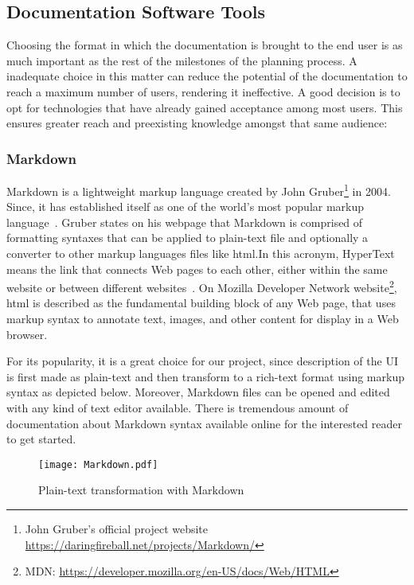 \subsection{Documentation Software Tools}

Choosing the format in which the documentation is brought to the end user is as much important as the rest of the milestones of the planning process. A inadequate choice in this matter can reduce the potential of the documentation to reach a maximum number of users, rendering it ineffective. A good decision is to opt for technologies that have already gained acceptance among most users. This ensures greater reach and preexisting knowledge amongst that same audience:

\subsubsection{Markdown}\label{sec:MD}

Markdown is a lightweight markup language created by John Gruber\footnote{John Gruber's official project website \url{https://daringfireball.net/projects/Markdown/}} in 2004. Since, it has established itself as one of the world's most popular markup language~\cite{Markdown}. Gruber states on his webpage that Markdown is comprised of formatting syntaxes that can be applied to plain-text file and optionally a converter to other markup languages files like \gls{html}.In this acronym, HyperText means the link that connects Web pages to each other, either within the same website or between different websites~\cite{mozillaMDN}. On Mozilla Developer Network website\footnote{MDN: \url{https://developer.mozilla.org/en-US/docs/Web/HTML}}, \gls*{html} is described as the fundamental building block of any Web page, that uses markup syntax to annotate text, images, and other content for display in a Web browser.

For its popularity, it is a great choice for our project, since description of the UI is first made as plain-text and then transform to a rich-text format using markup syntax as depicted below. Moreover, Markdown files can be opened and edited with any kind of text editor available. There is tremendous amount of documentation about Markdown syntax available online for the interested reader to get started.

\begin{figure}[h]
    \centering
    \texttt{[image: Markdown.pdf]}
    \caption{Plain-text transformation with Markdown}
    \label{fig:Markdown}
\end{figure}

